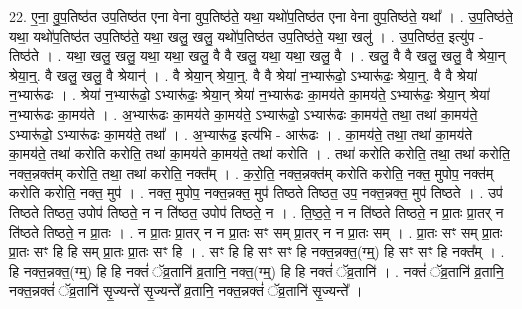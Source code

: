 \documentclass[17pt]{extarticle}
\begin{document}
22. ए॒ना॒ वु॒प॒तिष्ठ॑त उप॒तिष्ठ॑त एना वेना वुप॒तिष्ठ॑ते॒ यथा॒ यथो॑प॒तिष्ठ॑त एना वेना वुप॒तिष्ठ॑ते॒ यथा᳚ । . उ॒प॒तिष्ठ॑ते॒ यथा॒ यथो॑प॒तिष्ठ॑त उप॒तिष्ठ॑ते॒ यथा॒ खलु॒ खलु॒ यथो॑प॒तिष्ठ॑त उप॒तिष्ठ॑ते॒ यथा॒ खलु॑ । . उ॒प॒तिष्ठ॑त॒ इत्यु॑प - तिष्ठ॑ते । . यथा॒ खलु॒ खलु॒ यथा॒ यथा॒ खलु॒ वै वै खलु॒ यथा॒ यथा॒ खलु॒ वै । . खलु॒ वै वै खलु॒ खलु॒ वै श्रेया॒न् श्रेया॒न्॒. वै खलु॒ खलु॒ वै श्रेयान्॑ । . वै श्रेया॒न् श्रेया॒न्॒. वै वै श्रेया॑ न॒भ्यारू॑ढो॒ ऽभ्यारू॑ढः॒ श्रेया॒न्॒. वै वै श्रेया॑ न॒भ्यारू॑ढः । . श्रेया॑ न॒भ्यारू॑ढो॒ ऽभ्यारू॑ढः॒ श्रेया॒न् श्रेया॑ न॒भ्यारू॑ढः का॒मय॑ते का॒मय॑ते॒ ऽभ्यारू॑ढः॒ श्रेया॒न् श्रेया॑ न॒भ्यारू॑ढः का॒मय॑ते । . अ॒भ्यारू॑ढः का॒मय॑ते का॒मय॑ते॒ ऽभ्यारू॑ढो॒ ऽभ्यारू॑ढः का॒मय॑ते॒ तथा॒ तथा॑ का॒मय॑ते॒ ऽभ्यारू॑ढो॒ ऽभ्यारू॑ढः का॒मय॑ते॒ तथा᳚ । . अ॒भ्यारू॑ढ॒ इत्य॑भि - आरू॑ढः । . का॒मय॑ते॒ तथा॒ तथा॑ का॒मय॑ते का॒मय॑ते॒ तथा॑ करोति करोति॒ तथा॑ का॒मय॑ते का॒मय॑ते॒ तथा॑ करोति । . तथा॑ करोति करोति॒ तथा॒ तथा॑ करोति॒ नक्त॒न्नक्त॑म् करोति॒ तथा॒ तथा॑ करोति॒ नक्त᳚म् । . क॒रो॒ति॒ नक्त॒न्नक्त॑म् करोति करोति॒ नक्त॒ मुपोप॒ नक्त॑म् करोति करोति॒ नक्त॒ मुप॑ । . नक्त॒ मुपोप॒ नक्त॒न्नक्त॒ मुप॑ तिष्ठते तिष्ठत॒ उप॒ नक्त॒न्नक्त॒ मुप॑ तिष्ठते । . उप॑ तिष्ठते तिष्ठत॒ उपोप॑ तिष्ठते॒ न न ति॑ष्ठत॒ उपोप॑ तिष्ठते॒ न । . ति॒ष्ठ॒ते॒ न न ति॑ष्ठते तिष्ठते॒ न प्रा॒तः प्रा॒तर् न ति॑ष्ठते तिष्ठते॒ न प्रा॒तः । . न प्रा॒तः प्रा॒तर् न न प्रा॒तः सꣳ सम् प्रा॒तर् न न प्रा॒तः सम् । . प्रा॒तः सꣳ सम् प्रा॒तः प्रा॒तः सꣳ हि हि सम् प्रा॒तः प्रा॒तः सꣳ हि । . सꣳ हि हि सꣳ सꣳ हि नक्त॒न्नक्त॒(ग्म्॒) हि सꣳ सꣳ हि नक्त᳚म् । . हि नक्त॒न्नक्त॒(ग्म्॒) हि हि नक्तं॑ ॅव्र॒तानि॑ व्र॒तानि॒ नक्त॒(ग्म्॒) हि हि नक्तं॑ ॅव्र॒तानि॑ । . नक्तं॑ ॅव्र॒तानि॑ व्र॒तानि॒ नक्त॒न्नक्तं॑ ॅव्र॒तानि॑ सृ॒ज्यन्ते॑ सृ॒ज्यन्ते᳚ व्र॒तानि॒ नक्त॒न्नक्तं॑ ॅव्र॒तानि॑ सृ॒ज्यन्ते᳚ । \newline
\end{document}
